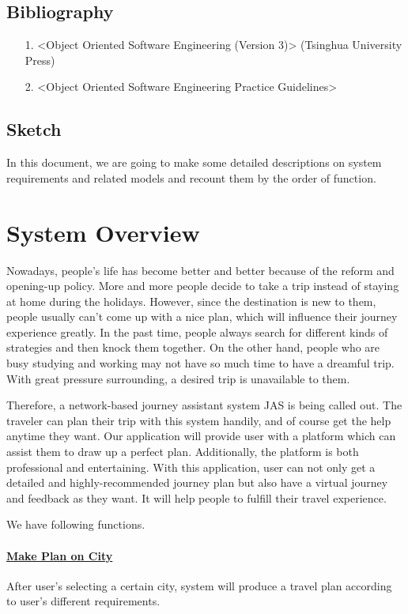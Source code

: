 \documentclass[10pt]{article}
\begin{document}
	\subsection{Bibliography}
	\begin{itemize}
		\item[1.] <Object Oriented Software Engineering (Version 3)> (Tsinghua University Press)
		\item[2.] <Object Oriented Software Engineering Practice Guidelines> 
	\end{itemize}

\subsection{Sketch}
In this document, we are going to make some detailed descriptions on system requirements and related models and recount them by the order of function.

\section{System Overview}
Nowadays, people’s life has become better and better because of the reform and opening-up policy. More and more people decide to take a trip instead of staying at home during the holidays. However, since the destination is new to them, people usually can’t come up with a nice plan, which will influence their journey experience greatly. In the past time, people always search for different kinds of strategies and then knock them together. On the other hand, people who are busy studying and working may not have so much time to have a dreamful trip. With great pressure surrounding, a desired trip is unavailable to them.

Therefore, a network-based journey assistant system JAS is being called out. The traveler can plan their trip with this system handily, and of course get the help anytime they want. Our application will provide user with a platform which can assist them to draw up a perfect plan. Additionally, the platform is both professional and entertaining. With this application, user can not only get a detailed and highly-recommended journey plan but also have a virtual journey and feedback as they want. It will help people to fulfill their travel experience. 

We have following functions. 

\paragraph{\underline{Make Plan on City}} After user’s selecting a certain city, system will produce a travel plan according to user’s different requirements.
\end{document}

